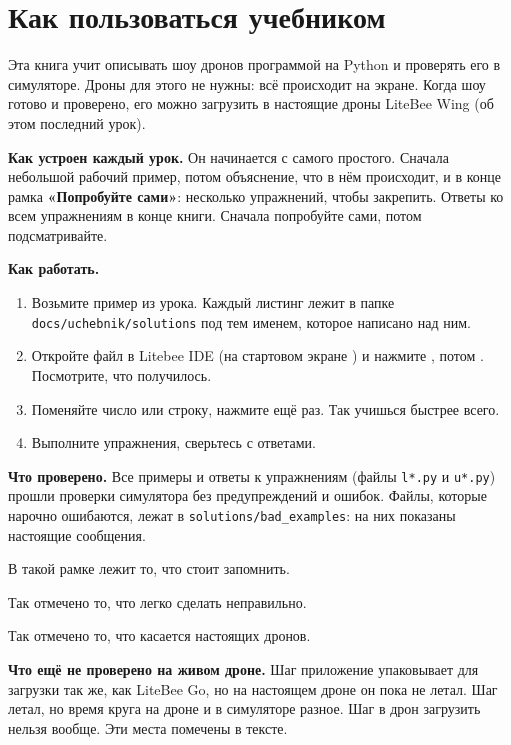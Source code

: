 \chapter*{Как пользоваться учебником}

Эта книга учит описывать шоу дронов программой на Python и проверять его в симуляторе. Дроны для этого не нужны: всё происходит на экране. Когда шоу готово и проверено, его можно загрузить в настоящие дроны LiteBee Wing (об этом последний урок).

\textbf{Как устроен каждый урок.} Он начинается с самого простого. Сначала небольшой рабочий пример, потом объяснение, что в нём происходит, и в конце рамка \textbf{«Попробуйте сами»}: несколько упражнений, чтобы закрепить. Ответы ко всем упражнениям в конце книги. Сначала попробуйте сами, потом подсматривайте.

\textbf{Как работать.}
\begin{enumerate}
  \item Возьмите пример из урока. Каждый листинг лежит в папке \texttt{docs/uchebnik/solutions} под тем именем, которое написано над ним.
  \item Откройте файл в Litebee IDE (на стартовом экране ) и нажмите , потом . Посмотрите, что получилось.
  \item Поменяйте число или строку, нажмите  ещё раз. Так учишься быстрее всего.
  \item Выполните упражнения, сверьтесь с ответами.
\end{enumerate}

\textbf{Что проверено.} Все примеры и ответы к упражнениям (файлы \texttt{l*.py} и \texttt{u*.py}) прошли проверки симулятора без предупреждений и ошибок. Файлы, которые нарочно ошибаются, лежат в \texttt{solutions/bad\_examples}: на них показаны настоящие сообщения.

\begin{zametka}
В такой рамке лежит то, что стоит запомнить.
\end{zametka}
\begin{vnimanie}[Осторожно]
Так отмечено то, что легко сделать неправильно.
\end{vnimanie}
\begin{opasno}[Безопасность]
Так отмечено то, что касается настоящих дронов.
\end{opasno}

\textbf{Что ещё не проверено на живом дроне.} Шаг  приложение упаковывает для загрузки так же, как LiteBee Go, но на настоящем дроне он пока не летал. Шаг  летал, но время круга на дроне и в симуляторе разное. Шаг  в дрон загрузить нельзя вообще. Эти места помечены в тексте.
